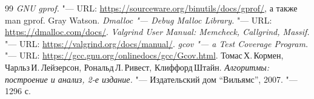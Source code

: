 \begin{thebibliography}{99}
{\itshape GNU gprof.} "--- URL: \url{https://sourceware.org/binutils/docs/gprof/}, а также {\ttfamily man gprof}.
Gray Watson. {\itshape Dmalloc "--- Debug Malloc Library.} "--- URL: \url{https://dmalloc.com/docs/}.
{\itshape Valgrind User Manual: Memcheck, Callgrind, Massif.} "--- URL: \url{https://valgrind.org/docs/manual/}.
{\itshape gcov "--- a Test Coverage Program.} "--- URL: \url{https://gcc.gnu.org/onlinedocs/gcc/Gcov.html}.
Томас\,Х.\,Кормен, Чарльз\,И.\,Лейзерсон, Рональд\,Л.\,Ривест, Клиффорд\,Штайн.
{\itshape Алгоритмы: построение и анализ, 2-е издание.} "--- Издательский дом \enquote{Вильямс}, 2007. "--- 1296 с.
\end{thebibliography}
\pagebreak
